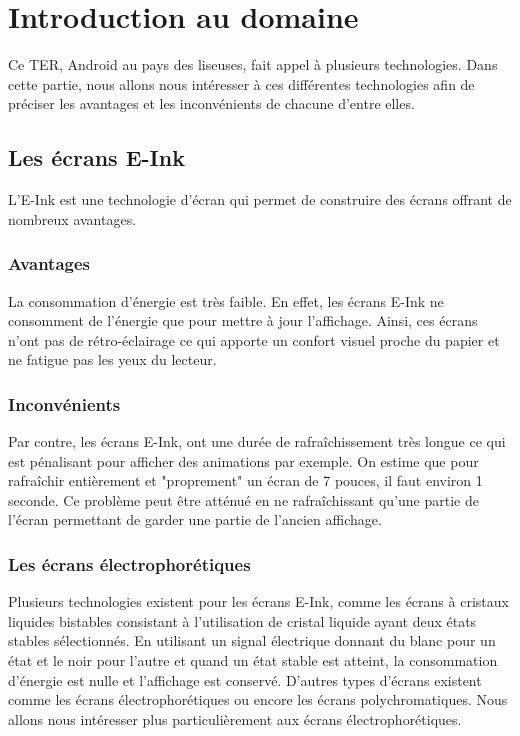 \chapter{Introduction au domaine}
Ce TER, Android au pays des liseuses, fait appel à plusieurs technologies. Dans cette partie, nous allons nous intéresser à ces différentes technologies afin de préciser les avantages et les inconvénients de chacune d'entre elles.

\section{Les écrans E-Ink}
L'E-Ink est une technologie d'écran qui permet de construire des écrans offrant de nombreux avantages.

\subsection{Avantages}
La consommation d'énergie est très faible. En effet, les écrans E-Ink ne consomment de l'énergie que pour mettre à jour l'affichage. Ainsi, ces écrans n'ont pas de rétro-éclairage ce qui apporte un confort visuel proche du papier et ne fatigue pas les yeux du lecteur. 

\subsection{Inconvénients}
Par contre, les écrans E-Ink, ont une durée de rafraîchissement très longue ce qui est pénalisant pour afficher des animations par exemple. On estime que pour rafraîchir entièrement et "proprement" un écran de 7 pouces, il faut environ 1 seconde. Ce problème peut être atténué en ne rafraîchissant qu'une partie de l'écran permettant de garder une partie de l'ancien affichage. 

\newpage

\subsection{Les écrans électrophorétiques}
Plusieurs technologies existent pour les écrans E-Ink, comme les écrans à cristaux liquides bistables consistant à l'utilisation de cristal liquide ayant deux états stables sélectionnés. En utilisant un signal électrique donnant du blanc pour un état et le noir pour l'autre et quand un état stable est atteint, la consommation d'énergie est nulle et l'affichage est conservé. D'autres types d'écrans existent comme les écrans électrophorétiques ou encore les écrans polychromatiques. Nous allons nous intéresser plus particulièrement aux écrans électrophorétiques.\\

